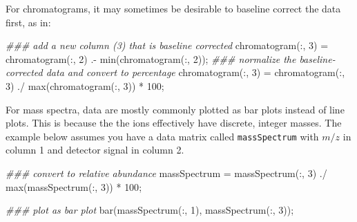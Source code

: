\documentclass[]{tufte-book}
\newenvironment{Shaded}{}{}
\newcommand{\CommentTok}[1]{\textcolor[rgb]{0.38,0.63,0.69}{\textit{#1}}}
\newcommand{\FloatTok}[1]{\textcolor[rgb]{0.25,0.63,0.44}{#1}}
\newcommand{\FunctionTok}[1]{\textcolor[rgb]{0.02,0.16,0.49}{#1}}
\newcommand{\NormalTok}[1]{#1}
\newcommand{\OperatorTok}[1]{\textcolor[rgb]{0.40,0.40,0.40}{#1}}
\begin{document}
For chromatograms, it may sometimes be desirable to baseline correct the data first, as in:

\begin{Shaded}
\begin{Highlighting}[]
\CommentTok{### add a new column (3) that is baseline corrected}
\NormalTok{chromatogram(}\OperatorTok{:,} \FloatTok{3}\NormalTok{) }\OperatorTok{=}\NormalTok{ chromatogram(}\OperatorTok{:,} \FloatTok{2}\NormalTok{) .}\OperatorTok{-} \FunctionTok{min}\NormalTok{(chromatogram(}\OperatorTok{:,} \FloatTok{2}\NormalTok{))}\OperatorTok{;}
\CommentTok{### normalize the baseline-corrected data and convert to percentage}
\NormalTok{chromatogram(}\OperatorTok{:,} \FloatTok{3}\NormalTok{) }\OperatorTok{=}\NormalTok{ chromatogram(}\OperatorTok{:,} \FloatTok{3}\NormalTok{) }\OperatorTok{./} \FunctionTok{max}\NormalTok{(chromatogram(}\OperatorTok{:,} \FloatTok{3}\NormalTok{)) }\OperatorTok{*} \FloatTok{100}\OperatorTok{;}
\end{Highlighting}
\end{Shaded}

For mass spectra, data are mostly commonly plotted as bar plots instead of line plots. This is because the the ions effectively have discrete, integer masses. The example below assumes you have a data matrix called \texttt{massSpectrum} with \(m/z\) in column 1 and detector signal in column 2.

\begin{Shaded}
\begin{Highlighting}[]
\CommentTok{### convert to relative abundance}
\NormalTok{massSpectrum }\OperatorTok{=}\NormalTok{ massSpectrum(}\OperatorTok{:,} \FloatTok{3}\NormalTok{) }\OperatorTok{./} \FunctionTok{max}\NormalTok{(massSpectrum(}\OperatorTok{:,} \FloatTok{3}\NormalTok{)) }\OperatorTok{*} \FloatTok{100}\OperatorTok{;}

\CommentTok{### plot as bar plot}
\FunctionTok{bar}\NormalTok{(massSpectrum(}\OperatorTok{:,} \FloatTok{1}\NormalTok{)}\OperatorTok{,}\NormalTok{ massSpectrum(}\OperatorTok{:,} \FloatTok{3}\NormalTok{))}\OperatorTok{;}
\end{Highlighting}
\end{Shaded}
\end{document}
